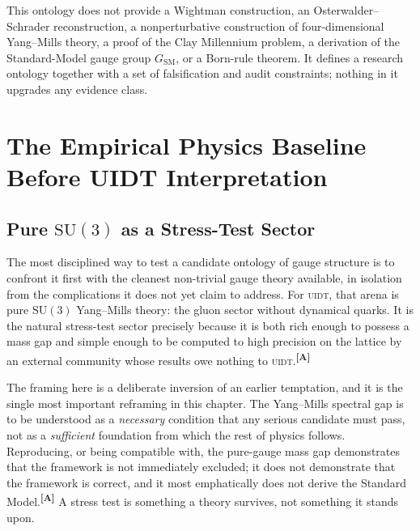 \documentclass[12pt,a4paper,twoside]{article}
\theoremstyle{plain}
\theoremstyle{definition}
\theoremstyle{remark}
\newcommand{\UIDT}{\textsc{uidt}}
\newcommand{\catmark}[1]{\textsuperscript{\textsf{\textbf{[#1]}}}}
\begin{document}
\begin{governancebox}
This ontology does not provide a Wightman construction, an
Osterwalder--Schrader reconstruction, a nonperturbative construction of
four-dimensional Yang--Mills theory, a proof of the Clay Millennium problem,
a derivation of the Standard-Model gauge group $G_{\mathrm{SM}}$, or a
Born-rule theorem. It defines a research ontology together with a set of
falsification and audit constraints; nothing in it upgrades any evidence
class.
\end{governancebox}

\newpage
\section{The Empirical Physics Baseline Before UIDT Interpretation}
\label{sec:empirical-baseline}

\subsection{Pure \texorpdfstring{$\mathrm{SU}(3)$}{SU(3)} as a Stress-Test Sector}
\label{subsec:su3-stress-test}

The most disciplined way to test a candidate ontology of gauge structure is to confront it first with the cleanest non-trivial gauge theory available, in isolation from the complications it does not yet claim to address. For \UIDT, that arena is pure $\mathrm{SU}(3)$ Yang--Mills theory: the gluon sector without dynamical quarks. It is the natural stress-test sector precisely because it is both rich enough to possess a mass gap and simple enough to be computed to high precision on the lattice by an external community whose results owe nothing to \UIDT.\catmark{A}

The framing here is a deliberate inversion of an earlier temptation, and it is the single most important reframing in this chapter. The Yang--Mills spectral gap is to be understood as a \emph{necessary} condition that any serious candidate must pass, not as a \emph{sufficient} foundation from which the rest of physics follows. Reproducing, or being compatible with, the pure-gauge mass gap demonstrates that the framework is not immediately excluded; it does not demonstrate that the framework is correct, and it most emphatically does not derive the Standard Model.\catmark{A} A stress test is something a theory survives, not something it stands upon.
\end{document}
